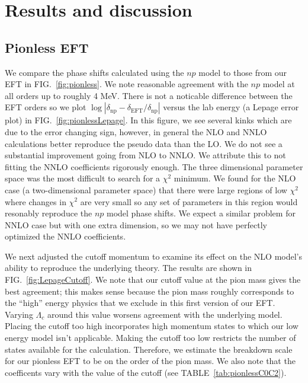 \documentclass[10pt,showpacs,preprintnumbers,footinbib,amsmath,amssymb,aps,prl,twocolumn,groupedaddress,superscriptaddress,showkeys]{revtex4-1}
\begin{document}
\section{Results and discussion}

\subsection{Pionless EFT}
We compare the phase shifts calculated using the $np$ model to those from our EFT
in FIG.~\ref{fig:pionless}. We note reasonable agreement with the $np$ model at
all orders up to roughly 4 MeV. There is not a noticable difference between the EFT
orders so we plot $ \log|\delta_{\mathrm{np}} - \delta _{\mathrm{EFT}} / 
\delta_{\mathrm{np}}|$ versus the lab energy (a Lepage error plot) in
FIG.~\ref{fig:pionlessLepage}. In this figure, we see several kinks which are due
to the error changing sign, however, in general the NLO and NNLO calculations
better reproduce the pseudo data than the LO. We do not see a substantial
improvement going from NLO to NNLO. We attribute this to not fitting the
NNLO coefficients rigorously enough. The three dimensional parameter space was
the most difficult to search for a $\chi^2$ minimum. We found for the NLO case
(a two-dimensional parameter space) that there were large regions of low $\chi^2$
where changes in $\chi^2$ are very small so any set of parameters in this region
would resonably reproduce the $np$ model phase shifts. We expect a similar problem
for NNLO case but with one extra dimension, so we may not have perfectly optimized
the NNLO coefficients.

We next adjusted the cutoff momentum to examine its effect on the NLO model's
ability to reproduce the underlying theory. The results are shown in
FIG.~\ref{fig:LepageCutoff}. We note that our cutoff value at the pion mass gives
the best agreement; this makes sense because the pion mass roughly corresponds
to the ``high'' energy physics that we exclude in this first version of our EFT. Varying
$\Lambda_c$ around this value worsens agreement with the underlying model.
Placing the cutoff too high incorporates high momentum states
to which our low energy model isn't applicable. Making the cutoff too low restricts
the number of states available for the calculation. Therefore, we estimate the
breakdown scale for our pionless EFT to be on the order of the pion mass.
We also note that the coefficents vary with the value of the cutoff
(see TABLE~\ref{tab:pionlessC0C2}).


\end{document}
